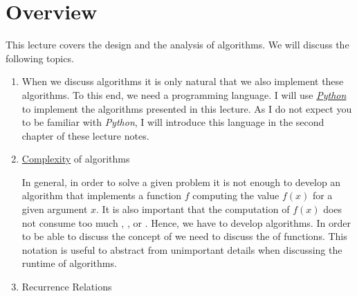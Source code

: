 \section{Overview}
This lecture covers the design and the analysis of algorithms.  We will discuss the following topics.
\begin{enumerate}
\item When we discuss algorithms it is only natural that we also implement these algorithms.  To this end, we need a
      programming language.  I will use \href{https://python.org}{\textsl{Python}} to implement the algorithms
      presented in this lecture.  As I do not expect you to be familiar with \textsl{Python}, I will introduce
      this language in the second chapter of these lecture notes.
\item \href{http://en.wikipedia.org/wiki/Computational_complexity_theory}{Complexity}  of algorithms

      In general, in order to solve a given problem it is not enough to develop an algorithm that
      implements a function $f$ computing the  value $f(x)$ for a given argument $x$.  It is also important  
      that the computation of $f(x)$ does not consume too much , , or .
      Hence, we have to develop  algorithms.  In order to be able to discuss the concept of
       we need to discuss the  of functions.  This notation is useful to abstract from
      unimportant details when discussing the runtime of algorithms.  
\item Recurrence Relations


\end{enumerate}

